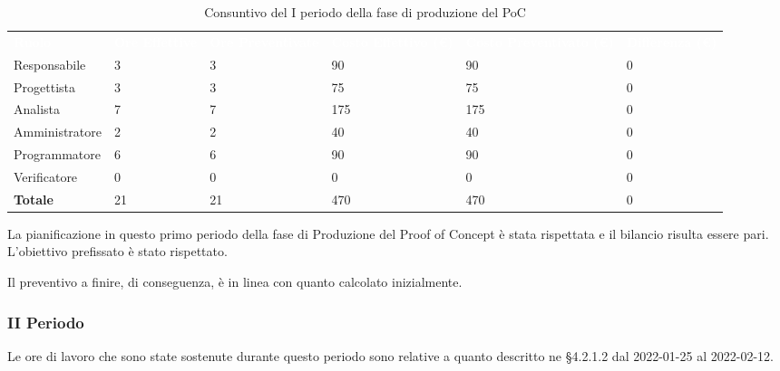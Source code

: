 \begin{table}[H]
\begin{center}
\renewcommand{\arraystretch}{1.5}
\begin{tabular}{ m{}<{\centering}  m{}<{\centering} m{}<{\centering} m{}<{\centering} m{}<{\centering} m{}<{\centering}}	\rowcolor{darkblue}
	\textcolor{white}{\textbf{Ruolo}} & \textcolor{white}{\textbf{Ore Effettive}} & \textcolor{white}{\textbf{Ore Preventivate}}&\textcolor{white}{\textbf{Costo Effettivo (\euro)}}&\textcolor{white}{\textbf{Costo Preventivato (\euro)}}&\textcolor{white}{\textbf{Differenza (\euro)}}\\ 
	
	Responsabile  & 3 & 3 & 90 & 90 & 0 \\	
	
	Progettista & 3 & 3 & 75 & 75 & 0 \\
	
	Analista & 7 & 7 & 175 & 175 & 0 \\

	Amministratore & 2 & 2 & 40 & 40 & 0 \\
	
	Programmatore & 6 & 6 & 90 & 90 &  0 \\
	
	Verificatore & 0 & 0 & 0 & 0 & 0 \\
	
	\textbf{Totale} & 21 & 21 & 470 & 470 & 0 \\
	
\end{tabular}
\caption{Consuntivo del I periodo della fase di produzione del PoC}
\end{center}
\end{table}

La pianificazione in questo primo periodo della fase di Produzione del Proof of Concept è stata rispettata e il bilancio risulta essere pari. L'obiettivo prefissato è stato rispettato.

Il preventivo a finire, di conseguenza, è in linea con quanto calcolato inizialmente.

\pagebreak

\subsubsection{II Periodo}
Le ore di lavoro che sono state sostenute durante questo periodo sono relative a quanto descritto ne §4.2.1.2 dal 2022-01-25 al 2022-02-12.


